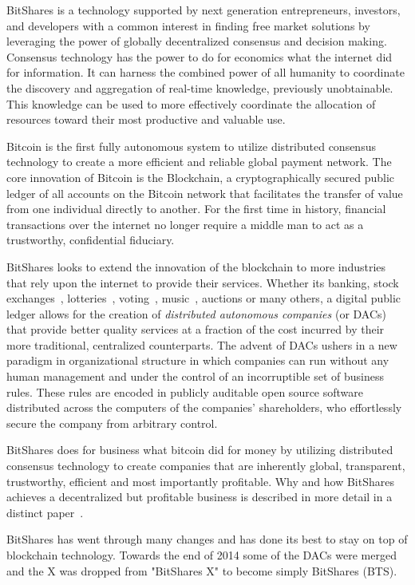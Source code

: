 BitShares is a technology supported by next generation entrepreneurs,
investors, and developers with a common interest in finding free market
solutions by leveraging the power of globally decentralized consensus and
decision making. Consensus technology has the power to do for economics what
the internet did for information. It can harness the combined power of all
humanity to coordinate the discovery and aggregation of real-time knowledge,
previously unobtainable. This knowledge can be used to more effectively
coordinate the allocation of resources toward their most productive and
valuable use.

Bitcoin is the first fully autonomous system to utilize distributed consensus
technology to create a more efficient and reliable global payment network. The
core innovation of Bitcoin is the Blockchain, a cryptographically secured
public ledger of all accounts on the Bitcoin network that facilitates the
transfer of value from one individual directly to another. For the first time
in history, financial transactions over the internet no longer require a middle
man to act as a trustworthy, confidential fiduciary.

BitShares looks to extend the innovation of the blockchain to more industries
that rely upon the internet to provide their services. Whether its banking,
stock exchanges~\cite{btst:oldwp}, lotteries~\cite{play}, voting~\cite{fmv},
music~\cite{peertracks}, auctions or many
others, a digital public ledger allows for the creation of \emph{distributed
autonomous companies} (or DACs) that provide better quality services at a
fraction of the cost incurred by their more traditional, centralized
counterparts. The advent of DACs ushers in a new paradigm in organizational
structure in which companies can run without any human management and under the
control of an incorruptible set of business rules. These rules are encoded in
publicly auditable open source software distributed across the computers of the
companies' shareholders, who effortlessly secure the company from arbitrary
control.

BitShares does for business what bitcoin did for money by utilizing distributed
consensus technology to create companies that are inherently global,
transparent, trustworthy, efficient and most importantly profitable. Why and
how BitShares achieves a decentralized but profitable business is described in
more detail in a distinct paper~\cite{}. %

BitShares has went through many changes and has done its best to stay on top of
blockchain technology. Towards the end of 2014 some of the DACs were merged and
the X was dropped from "BitShares X" to become simply BitShares (BTS).

